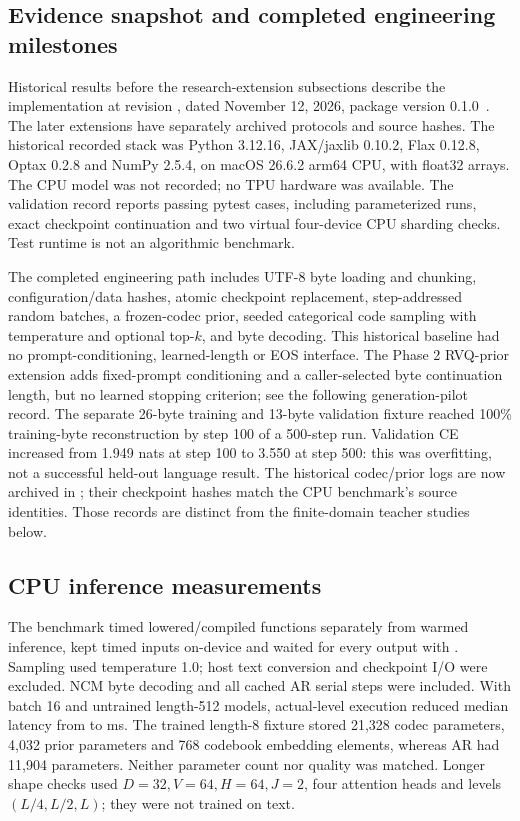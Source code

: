 \subsection{Evidence snapshot and completed engineering milestones}
Historical results before the research-extension subsections describe the implementation at revision
, dated November 12, 2026, package version 0.1.0~\citep{localrepo}.
The later extensions have separately archived protocols and source hashes.
The historical recorded stack was Python 3.12.16, JAX/jaxlib 0.10.2, Flax 0.12.8,
Optax 0.2.8 and NumPy 2.5.4, on macOS 26.6.2 arm64 CPU, with float32 arrays.
The CPU model was not recorded; no TPU hardware was available.
The validation record reports \TestCases{} passing pytest cases, including
parameterized runs, exact checkpoint continuation and two virtual four-device
CPU sharding checks. Test runtime is not an algorithmic benchmark.

The completed engineering path includes UTF-8 byte loading and chunking,
configuration/data hashes, atomic checkpoint replacement, step-addressed random
batches, a frozen-codec prior, seeded categorical code sampling with temperature
and optional top-$k$, and byte decoding. This historical baseline had no
prompt-conditioning, learned-length or EOS interface. The Phase 2 RVQ-prior
extension adds fixed-prompt conditioning and a caller-selected byte continuation
length, but no learned stopping criterion; see the following generation-pilot
record. The separate
26-byte training and 13-byte validation fixture reached 100\% training-byte
reconstruction by step 100 of a 500-step run. Validation CE increased from
1.949 nats at step 100 to 3.550 at step 500: this was overfitting, not a
successful held-out language result. The historical codec/prior logs are now
archived in ; their checkpoint hashes match the
CPU benchmark's source identities. Those records are distinct from the
finite-domain teacher studies below.

\subsection{CPU inference measurements}
\CPUBenchmarkTable
The benchmark timed lowered/compiled functions separately from warmed inference,
kept timed inputs on-device and waited for every output with
. Sampling used temperature 1.0; host text conversion
and checkpoint I/O were excluded. NCM byte decoding and all cached AR serial
steps were included. With batch 16 and untrained length-512 models, actual-level
execution reduced median latency from \PaddedLatency{} to \ActualLatency{} ms.
The trained length-8 fixture stored 21,328 codec parameters, 4,032 prior
parameters and 768 codebook embedding elements, whereas AR had 11,904 parameters.
Neither parameter count nor quality was matched. Longer shape checks used
\(D=32,V=64,H=64,J=2\), four attention heads and levels
\((L/4,L/2,L)\); they were not trained on text.

